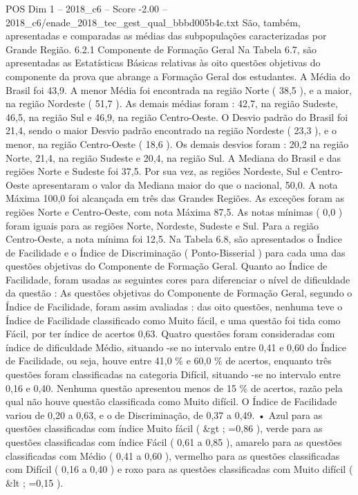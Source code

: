\begin{textsample}{POS Dim 1 – 2018\_c6 – Score -2.00 – 2018\_c6/enade\_2018\_tec\_gest\_qual\_bbbd005b4c.txt}
São, também, apresentadas e comparadas as médias das subpopulações caracterizadas por Grande Região. 6.2.1 Componente de Formação Geral Na Tabela 6.7, são apresentadas as Estatísticas Básicas relativas às oito questões objetivas do componente da prova que abrange a Formação Geral dos estudantes.
A Média do Brasil foi 43,9.
A menor Média foi encontrada na região Norte ( 38,5 ), e a maior, na região Nordeste ( 51,7 ).
As demais médias foram : 42,7, na região Sudeste, 46,5, na região Sul e 46,9, na região Centro-Oeste.
O Desvio padrão do Brasil foi 21,4, sendo o maior Desvio padrão encontrado na região Nordeste ( 23,3 ), e o menor, na região Centro-Oeste ( 18,6 ).
Os demais desvios foram : 20,2 na região Norte, 21,4, na região Sudeste e 20,4, na região Sul.
A Mediana do Brasil e das regiões Norte e Sudeste foi 37,5.
Por sua vez, as regiões Nordeste, Sul e Centro-Oeste apresentaram o valor da Mediana maior do que o nacional, 50,0.
A nota Máxima 100,0 foi alcançada em três das Grandes Regiões.
As exceções foram as regiões Norte e Centro-Oeste, com nota Máxima 87,5.
As notas mínimas ( 0,0 ) foram iguais para as regiões Norte, Nordeste, Sudeste e Sul.
Para a região Centro-Oeste, a nota mínima foi 12,5.
Na Tabela 6.8, são apresentados o Índice de Facilidade e o Índice de Discriminação ( Ponto-Bisserial ) para cada uma das questões objetivas do Componente de Formação Geral.
Quanto ao Índice de Facilidade, foram usadas as seguintes cores para diferenciar o nível de dificuldade da questão : As questões objetivas do Componente de Formação Geral, segundo o Índice de Facilidade, foram assim avaliadas : das oito questões, nenhuma teve o Índice de Facilidade classificado como Muito fácil, e uma questão foi tida como Fácil, por ter índice de acertos 0,63.
Quatro questões foram consideradas com índice de dificuldade Médio, situando -se no intervalo entre 0,41 e 0,60 do Índice de Facilidade, ou seja, houve entre 41,0 \% e 60,0 \% de acertos, enquanto três questões foram classificadas na categoria Difícil, situando -se no intervalo entre 0,16 e 0,40.
Nenhuma questão apresentou menos de 15 \% de acertos, razão pela qual não houve questão classificada como Muito difícil.
O Índice de Facilidade variou de 0,20 a 0,63, e o de Discriminação, de 0,37 a 0,49. • Azul para as questões classificadas com índice Muito fácil ( \&gt ; =0,86 ), verde para as questões classificadas com índice Fácil ( 0,61 a 0,85 ), amarelo para as questões classificadas com Médio ( 0,41 a 0,60 ), vermelho para as questões classificadas com Difícil ( 0,16 a 0,40 ) e roxo para as questões classificadas com Muito difícil ( \&lt ; =0,15 ).

\end{textsample}
